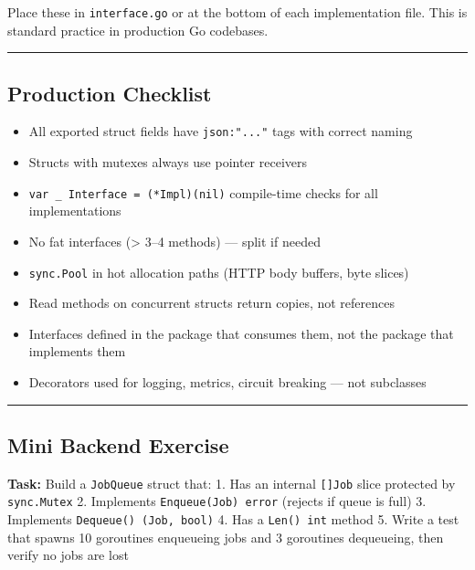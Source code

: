 \documentclass[
]{article}
\providecommand{\tightlist}{%
  \setlength{\itemsep}{0pt}\setlength{\parskip}{0pt}}
\begin{document}
Place these in \texttt{interface.go} or at the bottom of each
implementation file. This is standard practice in production Go
codebases.

\begin{center}\rule{0.5\linewidth}{0.5pt}\end{center}

\hypertarget{production-checklist-2}{%
\subsection{Production Checklist}\label{production-checklist-2}}

\begin{itemize}
\tightlist
\item[$\square$]
  All exported struct fields have \texttt{json:"..."} tags with correct
  naming
\item[$\square$]
  Structs with mutexes always use pointer receivers
\item[$\square$]
  \texttt{var\ \_\ Interface\ =\ (*Impl)(nil)} compile-time checks for
  all implementations
\item[$\square$]
  No fat interfaces (\textgreater{} 3--4 methods) --- split if needed
\item[$\square$]
  \texttt{sync.Pool} in hot allocation paths (HTTP body buffers, byte
  slices)
\item[$\square$]
  Read methods on concurrent structs return copies, not references
\item[$\square$]
  Interfaces defined in the package that consumes them, not the package
  that implements them
\item[$\square$]
  Decorators used for logging, metrics, circuit breaking --- not
  subclasses
\end{itemize}

\begin{center}\rule{0.5\linewidth}{0.5pt}\end{center}

\hypertarget{mini-backend-exercise-2}{%
\subsection{Mini Backend Exercise}\label{mini-backend-exercise-2}}

\textbf{Task:} Build a \texttt{JobQueue} struct that: 1. Has an internal
\texttt{{[}{]}Job} slice protected by \texttt{sync.Mutex} 2. Implements
\texttt{Enqueue(Job)\ error} (rejects if queue is full) 3. Implements
\texttt{Dequeue()\ (Job,\ bool)} 4. Has a \texttt{Len()\ int} method 5.
Write a test that spawns 10 goroutines enqueueing jobs and 3 goroutines
dequeueing, then verify no jobs are lost
\end{document}
